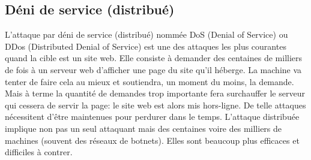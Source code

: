 \documentclass[article, french]{yReport}
\begin{document}
	\subsection{Déni de service (distribué)}
	\label{app:DoS}
	L'attaque par déni de service (distribué) nommée DoS (Denial of Service) ou DDos (Distributed Denial of Service) est une des attaques les plus courantes quand la cible est un site web. Elle consiste à demander des centaines de milliers de fois à un serveur web d'afficher une page du site qu'il héberge. La machine va tenter de faire cela au mieux et soutiendra, un moment du moins, la demande. Mais à terme la quantité de demandes trop importante fera surchauffer le serveur qui cessera de servir la page: le site web est alors mis hors-ligne. De telle attaques nécessitent d'être maintenues pour perdurer dans le temps. L'attaque distribuée implique non pas un seul attaquant mais des centaines voire des milliers de machines (souvent des réseaux de botnets). Elles sont beaucoup plus efficaces et difficiles à contrer.
	
\end{document}
